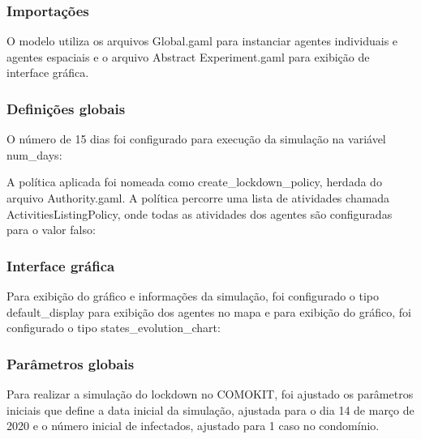 
\subsubsection{Importações}

O modelo utiliza os arquivos Global.gaml para instanciar agentes individuais e agentes espaciais e o arquivo Abstract Experiment.gaml para exibição de interface gráfica.

\subsubsection{Definições globais}

O número de 15 dias foi configurado para execução da simulação na variável num\_days:


A política aplicada foi nomeada como create\_lockdown\_policy, herdada do arquivo Authority.gaml. A política percorre uma lista de atividades chamada ActivitiesListingPolicy, onde todas as atividades dos agentes são configuradas para o valor falso:


\subsubsection{Interface gráfica}

Para exibição do gráfico e informações da simulação, foi configurado o tipo default\_display para exibição dos agentes no mapa e para exibição do gráfico, foi configurado o tipo states\_evolution\_chart:



\subsubsection{Parâmetros globais}

Para realizar a simulação do lockdown no COMOKIT, foi ajustado os parâmetros iniciais que define a data inicial da simulação, ajustada para o dia 14 de março de 2020 e o número inicial de infectados, ajustado para 1 caso no condomínio.

